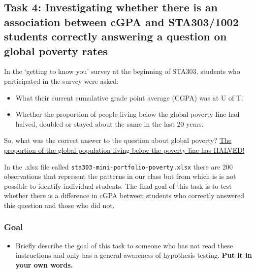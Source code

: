 \documentclass[
  openany]{book}
\providecommand{\tightlist}{%
  \setlength{\itemsep}{0pt}\setlength{\parskip}{0pt}}
\begin{document}
\newpage

\hypertarget{task-4-investigating-whether-there-is-an-association-between-cgpa-and-sta3031002-students-correctly-answering-a-question-on-global-poverty-rates}{%
\subsection{Task 4: Investigating whether there is an association between cGPA and STA303/1002 students correctly answering a question on global poverty rates}\label{task-4-investigating-whether-there-is-an-association-between-cgpa-and-sta3031002-students-correctly-answering-a-question-on-global-poverty-rates}}

In the `getting to know you' survey at the beginning of STA303, students who participated in the survey were asked:

\begin{itemize}
\tightlist
\item
  What their current cumulative grade point average (CGPA) was at U of T.
\item
  Whether the proportion of people living below the global poverty line had halved, doubled or stayed about the same in the last 20 years.
\end{itemize}

So, what was the correct answer to the question about global poverty? \href{https://www.gapminder.org/ignorance/ignorance-test/results/question-3/}{The proportion of the global population living below the poverty line has HALVED!}

In the .xlsx file called \texttt{sta303-mini-portfolio-poverty.xlsx} there are 200 observations that represent the patterns in our class but from which is is not possible to identify individual students. The final goal of this task is to test whether there is a difference in cGPA between students who correctly answered this question and those who did not.

\hypertarget{goal}{%
\subsubsection{Goal}\label{goal}}

\begin{itemize}
\tightlist
\item
  Briefly describe the goal of this task to someone who has not read these instructions and only has a general awareness of hypothesis testing. \textbf{Put it in your own words.}
\end{itemize}
\end{document}
